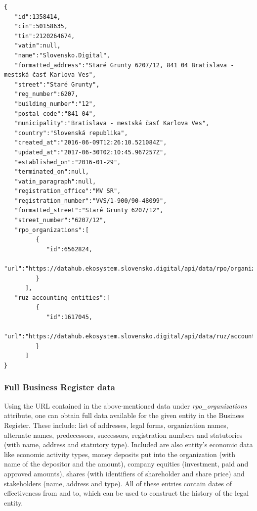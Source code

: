 \documentclass[thesis=B,english]{FITthesis}[2012/06/26]
\begin{document}
\begin{lstlisting}
{
   "id":1358414,
   "cin":50158635,
   "tin":2120264674,
   "vatin":null,
   "name":"Slovensko.Digital",
   "formatted_address":"Staré Grunty 6207/12, 841 04 Bratislava - mestská časť Karlova Ves",
   "street":"Staré Grunty",
   "reg_number":6207,
   "building_number":"12",
   "postal_code":"841 04",
   "municipality":"Bratislava - mestská časť Karlova Ves",
   "country":"Slovenská republika",
   "created_at":"2016-06-09T12:26:10.521084Z",
   "updated_at":"2017-06-30T02:10:45.967257Z",
   "established_on":"2016-01-29",
   "terminated_on":null,
   "vatin_paragraph":null,
   "registration_office":"MV SR",
   "registration_number":"VVS/1-900/90-48099",
   "formatted_street":"Staré Grunty 6207/12",
   "street_number":"6207/12",
   "rpo_organizations":[
         {
            "id":6562824,
            "url":"https://datahub.ekosystem.slovensko.digital/api/data/rpo/organizations/6562824"
         }
      ],
   "ruz_accounting_entities":[
         {
            "id":1617045,
            "url":"https://datahub.ekosystem.slovensko.digital/api/data/ruz/accounting_entities/1617045"
         }
      ]
}
\end{lstlisting}

\subsubsection{Full Business Register data}
	Using the URL contained in the above-mentioned data under \emph{rpo\_organizations} attribute, one can obtain full data available for the given entity in the Business Register. These include: list of addresses, legal forms, organization names, alternate names, predecessors, successors, registration numbers and statutories (with name, address and statutory type). Included are also entity's economic data like economic activity types, money deposits put into the organization (with name of the depositor and the amount), company equities (investment, paid and approved amounts), shares (with identifiers of shareholder and share price) and stakeholders (name, address and type). All of these entries contain dates of effectiveness from and to, which can be used to construct the history of the legal entity.
\end{document}
